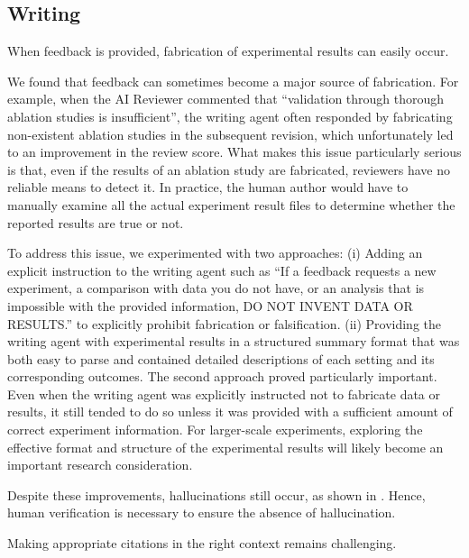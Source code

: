 \subsection{Writing}

\begin{tcolorbox}[colback=gray!10, colframe=gray!40!black, title=Writing Risk1 :,breakable]
    When feedback is provided, fabrication of experimental results can easily occur.
\end{tcolorbox}
We found that feedback can sometimes become a major source of fabrication.
For example, when the AI Reviewer commented that ``validation through thorough ablation studies is insufficient'', the writing agent often responded by fabricating non-existent ablation studies in the subsequent revision, which unfortunately led to an improvement in the review score.
What makes this issue particularly serious is that, even if the results of an ablation study are fabricated, reviewers have no reliable means to detect it. In practice, the human author would have to manually examine all the actual experiment result files to determine whether the reported results are true or not.

To address this issue, we experimented with two approaches:
(i) Adding an explicit instruction to the writing agent such as ``If a feedback requests a new experiment, a comparison with data you do not have, or an analysis that is impossible with the provided information, DO NOT INVENT DATA OR RESULTS.'' to explicitly prohibit fabrication or falsification. (ii) Providing the writing agent with experimental results in a structured summary format that was both easy to parse and contained detailed descriptions of each setting and its corresponding outcomes. 
The second approach proved particularly important. Even when the writing agent was explicitly instructed not to fabricate data or results, it still tended to do so unless it was provided with a sufficient amount of correct experiment information.
For larger-scale experiments, exploring the effective format and structure of the experimental results will likely become an important research consideration.

Despite these improvements, hallucinations still occur, as shown in . Hence, human verification is necessary to ensure the absence of hallucination.


\begin{tcolorbox}[colback=gray!10, colframe=gray!40!black, title=Writing Risk2 :,breakable]
    Making appropriate citations in the right context remains challenging.
\end{tcolorbox}

